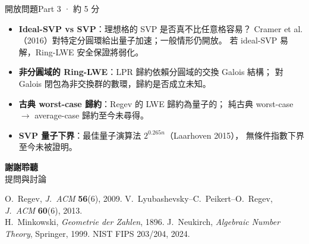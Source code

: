 \documentclass[aspectratio=169, 11pt]{beamer}
\begin{document}
\begin{frame}{開放問題}{Part 3 · 約 5 分}
  \begin{itemize}\small
    \item \textbf{Ideal-SVP vs SVP}：理想格的 SVP 是否真不比任意格容易？
      Cramer et al.（2016）對特定分圓環給出量子加速；一般情形仍開放。
      若 ideal-SVP 易解，Ring-LWE 安全保證將弱化。
    \item \textbf{非分圓域的 Ring-LWE}：LPR 歸約依賴分圓域的交換 Galois 結構；
      對 Galois 閉包為非交換群的數環，歸約是否成立未知。
    \item \textbf{古典 worst-case 歸約}：Regev 的 LWE 歸約為量子的；
      純古典 worst-case $\to$ average-case 歸約至今未尋得。
    \item \textbf{SVP 量子下界}：最佳量子演算法 $2^{0.265n}$（Laarhoven 2015），
      無條件指數下界至今未被證明。
  \end{itemize}
\end{frame}

\begin{frame}[plain]{}{}
  \vfill
  \begin{center}
    {\Large\bfseries\color{accent} 謝謝聆聽}\\[6pt]
    {\small\color{gray} 提問與討論}
  \end{center}
  \vfill
  \begin{center}\scriptsize\color{gray}
    O.\ Regev, \textit{J.\ ACM} \textbf{56}(6), 2009.\quad
    V.\ Lyubashevsky--C.\ Peikert--O.\ Regev, \textit{J.\ ACM} \textbf{60}(6), 2013.\\
    H.\ Minkowski, \textit{Geometrie der Zahlen}, 1896.\quad
    J.\ Neukirch, \textit{Algebraic Number Theory}, Springer, 1999.\quad
    NIST FIPS 203/204, 2024.
  \end{center}
\end{frame}
\end{document}
